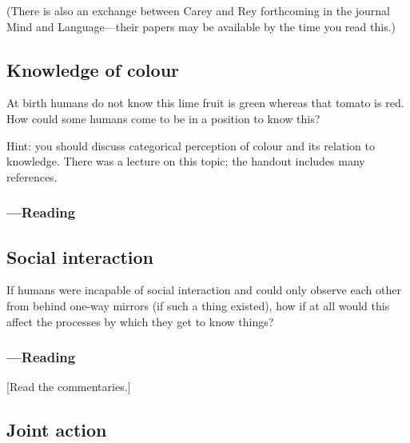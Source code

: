\documentclass[12pt,\papersize]{extarticle}
\begin{document}
(There is also an exchange between Carey and Rey forthcoming in the journal Mind and Language---their papers may be available by the time you read this.)




\subsection{Knowledge of colour}
At birth humans do not know this lime fruit is green whereas that tomato is red.
How could some humans come to be in a position to know this?

Hint: you should discuss categorical perception of colour and its relation to knowledge.  There was a lecture on this topic; the handout includes many references.

\subsubsection{---Reading}









\subsection{Social interaction}
If humans were incapable of social interaction and could only observe each other from behind one-way mirrors (if such a thing existed), how if at all would this affect the processes by which they get to know things?

\subsubsection{---Reading}



 [Read the commentaries.]




\subsection{Joint action}
\end{document}
